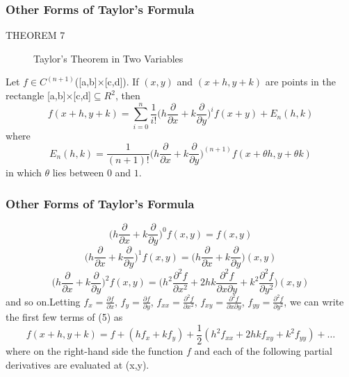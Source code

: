 \documentclass[notheorems,mathserif,table,compress]{beamer}  %
\begin{document}
\begin{frame}
  \frametitle{Other Forms of Taylor's Formula}
\begin{description}
\item[THEOREM 7] \textsf{Taylor's Theorem in Two Variables}
\end{description}
Let $f \in C^{(n+1)}$([a,b]×[c,d]). If $(x,y)$ and $(x+h,y+k)$ are points in the rectangle [a,b]×[c,d]$\subseteq R^2$, then
\begin{displaymath}
f(x+h,y+k) = \sum_{i=0}^n \frac{1}{i!}\bigg(h\frac{\partial}{\partial x}+k\frac{\partial}{\partial y}\bigg)^i f(x+y)+E_n(h,k)
\end{displaymath}
where
\begin{displaymath}
E_n(h,k)=\frac{1}{(n+1)!} \bigg(h\frac{\partial}{\partial x}+k\frac{\partial}{\partial y}\bigg)^{(n+1)}f(x+\theta h,y+\theta k)
\end{displaymath}
in which $\theta$ lies between $0$ and $1$.
\end{frame}

\begin{frame}
  \frametitle{Other Forms of Taylor's Formula}
\begin{displaymath}
\bigg(h\frac{\partial}{\partial x}+k\frac{\partial}{\partial y}\bigg)^0f(x,y)=f(x,y)
\end{displaymath}
\begin{displaymath}
\bigg(h\frac{\partial}{\partial x}+k\frac{\partial}{\partial y}\bigg)^1f(x,y)=\bigg(h\frac{\partial}{\partial x}+k\frac{\partial}{\partial y}\bigg)(x,y)
\end{displaymath}
\begin{displaymath}
\bigg(h\frac{\partial}{\partial x}+k\frac{\partial}{\partial y}\bigg)^2f(x,y)=\bigg(h^2\frac{\partial^2f}{\partial x^2}+2hk\frac{\partial^2f}{\partial x\partial y}+k^2\frac{\partial^2f}{\partial y^2}\bigg)(x,y)
\end{displaymath}
and so on.Letting $f_x=\frac{ \partial f}{\partial x}$, $f_y=\frac{\partial f}{\partial y}$, $f_{xx}=\frac{ \partial^2f}{\partial x^2}$, $f_{xy}=\frac{ \partial^2f}{\partial x \partial y}$, $f_{yy}=\frac{ \partial^2f}{\partial y^2}$, we can write the first few terms of (5) as 
\begin{displaymath}
f(x+h,y+k) =f+(hf_x+kf_y)+\frac{1}{2}(h^2 f_{xx}+2hkf_{xy}+k^2f_{yy})+\ldots
\end{displaymath}
where on the right-hand side the function $f$ and each of the following partial derivatives are evaluated at (x,y).
\end{frame}
 
\end{document}

